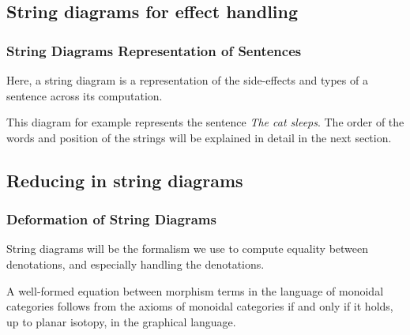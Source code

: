 \documentclass[math, english, info]{beamercours}
\begin{document}
\subsection{String diagrams for effect handling}
\begin{frame}[allowframebreaks]
	\frametitle{String Diagrams Representation of Sentences}
	Here, a string diagram is a representation of the side-effects and types of a
	sentence across its computation.

	\begin{center}
		\begin{minipage}[c]{.45\textwidth}
		\end{minipage}
		\begin{minipage}[c]{.45\textwidth}
			This diagram for example represents the sentence \textsl{The cat sleeps}.
			The order of the words and position of the strings will be explained in
			detail in the next section.
		\end{minipage}
	\end{center}

\end{frame}

\subsection{Reducing in string diagrams}
\begin{frame}
	\frametitle{Deformation of String Diagrams}
	String diagrams will be the formalism we use to compute equality between
	denotations, and especially handling the denotations.
	\begin{thm}
		\label{thm:isotopy}
		A well-formed equation between morphism terms in the language of monoidal
		categories follows from the axioms of monoidal categories if and only if it
		holds, up to planar isotopy, in the graphical language.
	\end{thm}
\end{frame}
\end{document}
